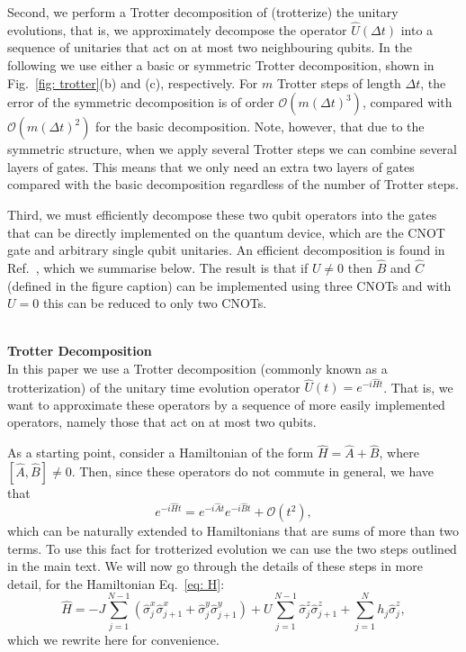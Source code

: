 \documentclass[twocolumn,showpacs,preprintnumbers,nofootinbib,amsmath,aps,pra,longbibliography,amssymb,superscriptaddress]{revtex4-1}
\begin{document}
Second, we perform a Trotter decomposition of (trotterize) the unitary evolutions, that is, we approximately decompose the operator $\hat{U}(\Delta t)$ into a sequence of unitaries that act on at most two neighbouring qubits. In the following we use either a basic or symmetric Trotter decomposition, shown in Fig.~\ref{fig: trotter}(b) and (c), respectively. For $m$ Trotter steps of length $\Delta t$, the error of the symmetric decomposition is of order $\mathcal{O}(m(\Delta t)^3)$, compared with $\mathcal{O}(m(\Delta t)^2)$ for the basic decomposition. Note, however, that due to the symmetric structure, when we apply several Trotter steps we can combine several layers of gates. This means that we only need an extra two layers of gates compared with the basic decomposition regardless of the number of Trotter steps. 

Third, we must efficiently decompose these two qubit operators into the gates that can be directly implemented on the quantum device, which are the CNOT gate and arbitrary single qubit unitaries. An efficient decomposition is found in Ref.~\cite{Vatan2004a}, which we summarise below. The result is that if $U\neq0$ then $\hat{B}$ and $\hat{C}$ (defined in the figure caption) can be implemented using three CNOTs and with $U=0$ this can be reduced to only two CNOTs.



\hfill\\\textbf{Trotter Decomposition}\\
In this paper we use a Trotter decomposition (commonly known as a trotterization) of the unitary time evolution operator $\hat{U}(t) = e^{-i\hat{H}t}$. That is, we want to approximate these operators by a sequence of more easily implemented operators, namely those that act on at most two qubits.

As a starting point, consider a Hamiltonian of the form $\hat{H} = \hat{A} + \hat{B}$, where $[ \hat{A},\hat{B}] \neq 0$. Then, since these operators do not commute in general, we have that
\begin{equation}\label{eq: trotter decomp}
e^{-i\hat{H}t} = e^{-i\hat{A}t} e^{-i\hat{B}t} + \mathcal{O}(t^2),
\end{equation}
which can be naturally extended to Hamiltonians that are sums of more than two terms. To use this fact for trotterized evolution we can use the two steps outlined in the main text. We will now go through the details of these steps in more detail, for the Hamiltonian Eq.~\eqref{eq: H}:
\begin{equation}
\hat{H} = - J\sum_{j=1}^{N-1} \left(\hat{\sigma}^x_j\hat{\sigma}^x_{j+1} + \hat{\sigma}^y_j \hat{\sigma}^y_{j+1}\right) + U \sum_{j=1}^{N-1} \hat{\sigma}^z_j \hat{\sigma}^z_{j+1} + \sum_{j=1}^N h_j \hat{\sigma}^z_j,
\end{equation}
which we rewrite here for convenience.
\end{document}
